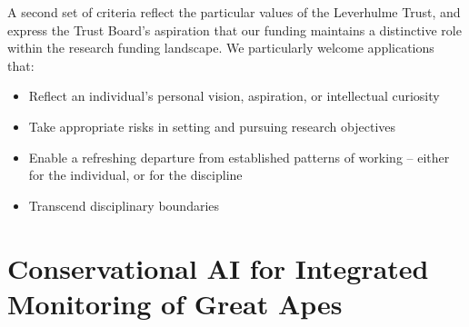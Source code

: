 \documentclass{article}
\begin{document}
A second set of criteria reflect the particular values of the Leverhulme Trust, and express the Trust Board’s aspiration that our funding maintains a distinctive role within the research funding landscape. We particularly welcome applications that:

\begin{itemize}
    \item Reflect an individual’s personal vision, aspiration, or intellectual curiosity
    \item Take appropriate risks in setting and pursuing research objectives 
    \item Enable a refreshing departure from established patterns of working – either for the individual, or for the discipline
    \item Transcend disciplinary boundaries
\end{itemize}




\newpage

\section*{Conservational AI for Integrated Monitoring of Great Apes}
\end{document}

